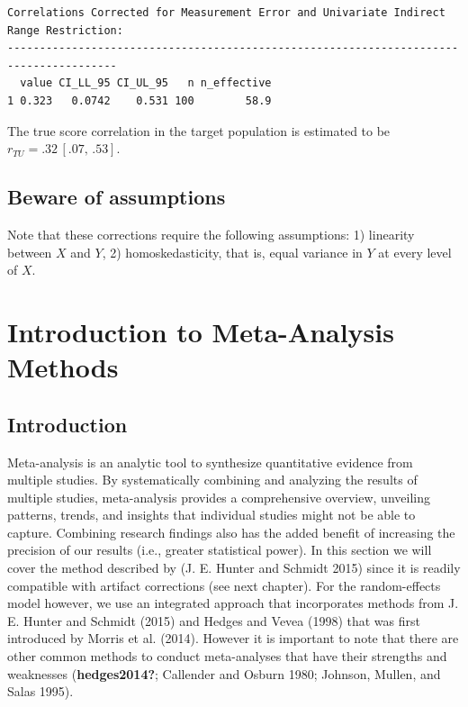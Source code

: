 \documentclass[
  letterpaper,
  DIV=11,
  numbers=noendperiod]{scrreprt}
\begin{document}
\begin{tcolorbox}
\begin{verbatim}
Correlations Corrected for Measurement Error and Univariate Indirect Range Restriction:
---------------------------------------------------------------------------------------
  value CI_LL_95 CI_UL_95   n n_effective
1 0.323   0.0742    0.531 100        58.9
\end{verbatim}

The true score correlation in the target population is estimated to be
\(r_{TU} = .32\, [.07,\, .53]\).

\end{tcolorbox}

\section*{Beware of assumptions}\label{beware-of-assumptions}


Note that these corrections require the following assumptions: 1)
linearity between \(X\) and \(Y\), 2) homoskedasticity, that is, equal
variance in \(Y\) at every level of \(X\).


\chapter{Introduction to Meta-Analysis
Methods}\label{sec-metaanalysis_intro}

\section{Introduction}\label{introduction-8}

Meta-analysis is an analytic tool to synthesize quantitative evidence
from multiple studies. By systematically combining and analyzing the
results of multiple studies, meta-analysis provides a comprehensive
overview, unveiling patterns, trends, and insights that individual
studies might not be able to capture. Combining research findings also
has the added benefit of increasing the precision of our results (i.e.,
greater statistical power). In this section we will cover the method
described by (J. E. Hunter and Schmidt 2015) since it is readily
compatible with artifact corrections (see next chapter). For the
random-effects model however, we use an integrated approach that
incorporates methods from J. E. Hunter and Schmidt (2015) and Hedges and
Vevea (1998) that was first introduced by Morris et al. (2014). However
it is important to note that there are other common methods to conduct
meta-analyses that have their strengths and weaknesses
(\textbf{hedges2014?}; Callender and Osburn 1980; Johnson, Mullen, and
Salas 1995).
\end{document}
